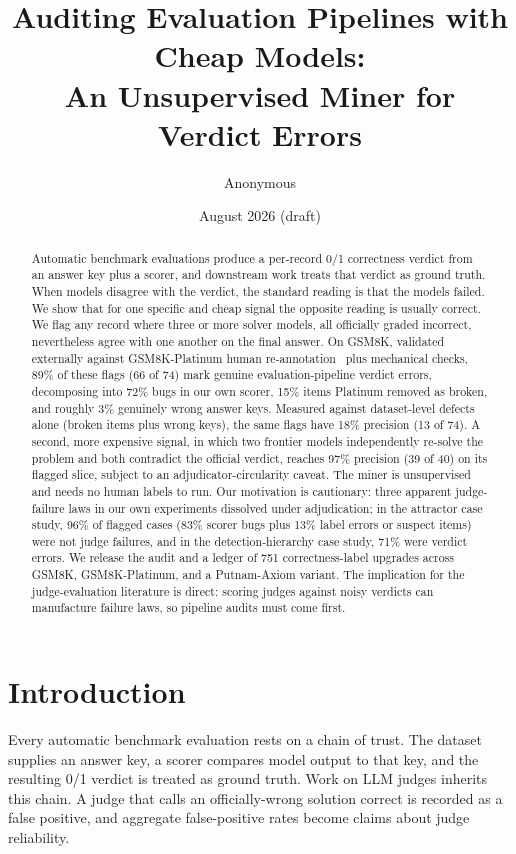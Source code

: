\documentclass[11pt]{article}
\title{Auditing Evaluation Pipelines with Cheap Models:\\ An Unsupervised Miner for Verdict Errors}
\author{Anonymous}
\date{August 2026 (draft)}
\begin{document}
\maketitle

\begin{abstract}
Automatic benchmark evaluations produce a per-record 0/1 correctness verdict from an answer key plus a scorer, and downstream work treats that verdict as ground truth.
When models disagree with the verdict, the standard reading is that the models failed.
We show that for one specific and cheap signal the opposite reading is usually correct.
We flag any record where three or more solver models, all officially graded incorrect, nevertheless agree with one another on the final answer.
On GSM8K, validated externally against GSM8K-Platinum human re-annotation~\cite{platinum} plus mechanical checks, 89\% of these flags (66 of 74) mark genuine evaluation-pipeline verdict errors, decomposing into 72\% bugs in our own scorer, 15\% items Platinum removed as broken, and roughly 3\% genuinely wrong answer keys.
Measured against dataset-level defects alone (broken items plus wrong keys), the same flags have 18\% precision (13 of 74).
A second, more expensive signal, in which two frontier models independently re-solve the problem and both contradict the official verdict, reaches 97\% precision (39 of 40) on its flagged slice, subject to an adjudicator-circularity caveat.
The miner is unsupervised and needs no human labels to run.
Our motivation is cautionary: three apparent judge-failure laws in our own experiments dissolved under adjudication; in the attractor case study, 96\% of flagged cases (83\% scorer bugs plus 13\% label errors or suspect items) were not judge failures, and in the detection-hierarchy case study, 71\% were verdict errors.
We release the audit and a ledger of 751 correctness-label upgrades across GSM8K, GSM8K-Platinum, and a Putnam-Axiom variant.
The implication for the judge-evaluation literature is direct: scoring judges against noisy verdicts can manufacture failure laws, so pipeline audits must come first.
\end{abstract}

\section{Introduction}

Every automatic benchmark evaluation rests on a chain of trust.
The dataset supplies an answer key, a scorer compares model output to that key, and the resulting 0/1 verdict is treated as ground truth.
Work on LLM judges inherits this chain.
A judge that calls an officially-wrong solution correct is recorded as a false positive, and aggregate false-positive rates become claims about judge reliability.
\end{document}
